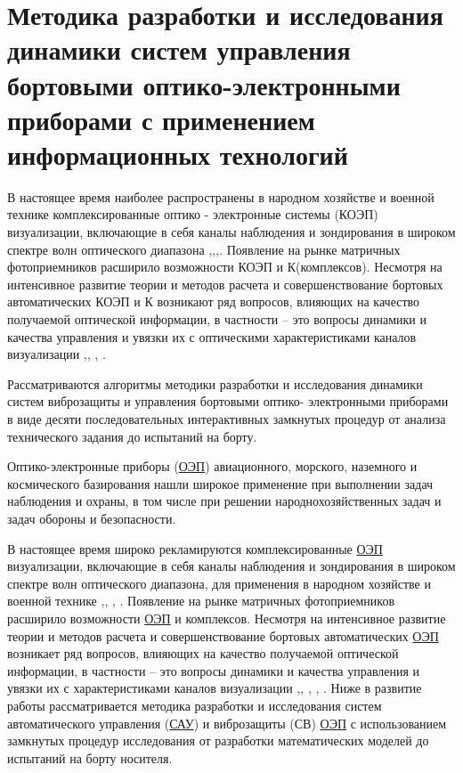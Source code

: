\chapter{Методика разработки и исследования динамики систем управления бортовыми оптико-электронными приборами с применением информационных технологий} \label{ch:ch2}

В настоящее время наиболее распространены в народном хозяйстве и военной технике комплексированные оптико - электронные системы (КОЭП) визуализации, включающие в себя каналы наблюдения и зондирования в широком спектре волн оптического диапазона \cite[]{Tarasov},\cite[]{Belyakov},\cite[]{Karpov},\cite[]{Torshina}. Появление на рынке матричных фотоприемников расширило возможности КОЭП и К(комплексов). Несмотря на интенсивное развитие   теории и методов расчета и совершенствование бортовых автоматических КОЭП и К  возникают ряд вопросов, влияющих на качество получаемой оптической информации, в частности – это вопросы динамики и качества управления и увязки их с оптическими характеристиками каналов визуализации \cite[]{Belyakov},\cite[]{Karpov}, \cite[]{Baloev16}, \cite[]{Karpov17}.

Рассматриваются алгоритмы методики разработки и исследования динамики систем виброзащиты и управления бортовыми оптико- электронными приборами в виде десяти последовательных интерактивных замкнутых процедур от анализа технического задания до испытаний на борту.

Оптико-электронные приборы (\hyperref[acroEOS]{ОЭП}) авиационного, морского, наземного и космического базирования нашли широкое применение при выполнении задач наблюдения и охраны, в том числе при решении народнохозяйственных задач и задач обороны и безопасности.

В настоящее время широко рекламируются комплексированные \hyperref[acroEOS]{ОЭП} визуализации, включающие в себя каналы наблюдения и зондирования в широком спектре волн оптического диапазона, для применения в народном хозяйстве и военной технике \cite[]{Tarasov},\cite[]{Belyakov}, \cite[]{Torshina}, \cite[]{Ivanov18}. Появление на рынке матричных фотоприемников расширило возможности \hyperref[acroEOS]{ОЭП} и комплексов. Несмотря на интенсивное развитие   теории и методов расчета и совершенствование бортовых автоматических \hyperref[acroEOS]{ОЭП} возникает ряд вопросов, влияющих на качество получаемой оптической информации, в частности – это вопросы динамики и качества управления и увязки их с характеристиками каналов визуализации \cite[]{Tarasov},\cite[]{Belyakov}, \cite[]{Baloev16}, \cite[]{Karpov17}, \cite[]{Gerasin19}. Ниже в развитие работы \cite[]{Tarasov} рассматривается методика разработки и исследования систем автоматического управления (\hyperref[acroSAU]{САУ}) и виброзащиты (СВ) \hyperref[acroEOS]{ОЭП} с использованием замкнутых процедур исследования от разработки математических моделей до испытаний на борту носителя.


